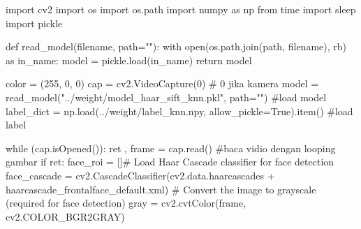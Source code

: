 \documentclass[
  letterpaper,
  DIV=11,
  numbers=noendperiod]{scrreprt}
\newenvironment{Shaded}{\begin{snugshade}}{\end{snugshade}}
\newcommand{\BuiltInTok}[1]{\textcolor[rgb]{0.00,0.23,0.31}{#1}}
\newcommand{\CommentTok}[1]{\textcolor[rgb]{0.37,0.37,0.37}{#1}}
\newcommand{\ControlFlowTok}[1]{\textcolor[rgb]{0.00,0.23,0.31}{#1}}
\newcommand{\DecValTok}[1]{\textcolor[rgb]{0.68,0.00,0.00}{#1}}
\newcommand{\ImportTok}[1]{\textcolor[rgb]{0.00,0.46,0.62}{#1}}
\newcommand{\KeywordTok}[1]{\textcolor[rgb]{0.00,0.23,0.31}{#1}}
\newcommand{\NormalTok}[1]{\textcolor[rgb]{0.00,0.23,0.31}{#1}}
\newcommand{\OperatorTok}[1]{\textcolor[rgb]{0.37,0.37,0.37}{#1}}
\newcommand{\StringTok}[1]{\textcolor[rgb]{0.13,0.47,0.30}{#1}}
\newcommand{\VariableTok}[1]{\textcolor[rgb]{0.07,0.07,0.07}{#1}}
\begin{document}
\begin{Shaded}
\begin{Highlighting}[]
\ImportTok{import}\NormalTok{ cv2}
\ImportTok{import}\NormalTok{ os}
\ImportTok{import}\NormalTok{ os.path}
\ImportTok{import}\NormalTok{ numpy }\ImportTok{as}\NormalTok{ np}
\ImportTok{from}\NormalTok{ time }\ImportTok{import}\NormalTok{ sleep}
\ImportTok{import}\NormalTok{ pickle}

\KeywordTok{def}\NormalTok{ read\_model(filename, path}\OperatorTok{=}\StringTok{""}\NormalTok{):}
    \ControlFlowTok{with} \BuiltInTok{open}\NormalTok{(os.path.join(path, filename), }\StringTok{\textquotesingle{}rb\textquotesingle{}}\NormalTok{) }\ImportTok{as}\NormalTok{ in\_name:}
\NormalTok{        model }\OperatorTok{=}\NormalTok{ pickle.load(in\_name)}
        \ControlFlowTok{return}\NormalTok{ model}
    

\NormalTok{color }\OperatorTok{=}\NormalTok{ (}\DecValTok{255}\NormalTok{, }\DecValTok{0}\NormalTok{, }\DecValTok{0}\NormalTok{)}
\NormalTok{cap }\OperatorTok{=}\NormalTok{ cv2.VideoCapture(}\DecValTok{0}\NormalTok{) }\CommentTok{\# 0 jika kamera}
\NormalTok{model }\OperatorTok{=}\NormalTok{ read\_model(}\StringTok{"../weight/model\_haar\_sift\_knn.pkl"}\NormalTok{, path}\OperatorTok{=}\StringTok{""}\NormalTok{) }\CommentTok{\#load model}
\NormalTok{label\_dict }\OperatorTok{=}\NormalTok{ np.load(}\StringTok{\textquotesingle{}../weight/label\_knn.npy\textquotesingle{}}\NormalTok{, allow\_pickle}\OperatorTok{=}\VariableTok{True}\NormalTok{).item() }\CommentTok{\#load label}


\ControlFlowTok{while}\NormalTok{ (cap.isOpened()):}
\NormalTok{    ret , frame }\OperatorTok{=}\NormalTok{ cap.read() }\CommentTok{\#baca vidio dengan looping gambar}
    \ControlFlowTok{if}\NormalTok{ ret:}
\NormalTok{        face\_roi }\OperatorTok{=}\NormalTok{ []}\CommentTok{\# Load Haar Cascade classifier for face detection}
\NormalTok{        face\_cascade }\OperatorTok{=}\NormalTok{ cv2.CascadeClassifier(cv2.data.haarcascades }\OperatorTok{+} \StringTok{\textquotesingle{}haarcascade\_frontalface\_default.xml\textquotesingle{}}\NormalTok{)}
        \CommentTok{\# Convert the image to grayscale (required for face detection)}
\NormalTok{        gray }\OperatorTok{=}\NormalTok{ cv2.cvtColor(frame, cv2.COLOR\_BGR2GRAY)}


\end{Highlighting}
\end{Shaded}
\end{document}
